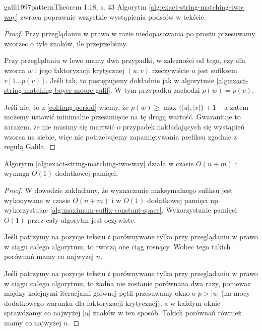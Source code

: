 \begin{theorem}{galil1997pattern}{Theorem 1.18, s. 43}
  Algorytm \ref{alg:exact-string-matching-two-way} zwraca poprawnie wszystkie wystąpienia podsłów w tekście.
\end{theorem}

\begin{proof}
  Przy przeglądaniu w prawo w razie niedopasowania po prostu przesuwamy wzorzec o tyle znaków, ile przejrzeliśmy.

  Przy przeglądaniu w lewo mamy dwa przypadki, w zależności od tego, czy dla wzorca $w$ i jego faktoryzacji krytycznej $(u, v)$ rzeczywiście $u$ jest sufiksem $v[1 \ldots p(v)]$.
  Jeśli tak, to postępujemy dokładnie jak w algorytmie \ref{alg:exact-string-matching-boyer-moore-galil}. W tym przypadku zachodzi $p(w) = p(v)$.

  Jeśli nie, to z \ref{col:long-period} wiemy, że $p(w) \ge \max\{|u|, |v|\} + 1$ -- a zatem możemy ustawić minimalne przesunięcie na tę drugą wartość.
  Gwarantuje to zarazem, że nie musimy się martwić o przypadek nakładających się wystąpień wzorca na siebie, więc nie potrzebujemy zapamiętywania prefiksu zgodnie z regułą Galila.
\end{proof}

\begin{theorem}{}{}
  Algorytm \ref{alg:exact-string-matching-two-way} działa w czasie $O(n + m)$ i wymaga $O(1)$ dodatkowej pamięci.
\end{theorem}

\begin{proof}
  W dowodzie zakładamy, że wyznaczanie maksymalnego sufiksu jest wykonywane w czasie $O(n + m)$ i w $O(1)$ dodatkowej pamięci np. wykorzystując \ref{alg:maximum-suffix-constant-space}. Wykorzystanie pamięci $O(1)$ przez cały algorytm jest oczywiste.

  Jeśli patrzymy na pozycje tekstu $t$ porównywane tylko przy przeglądaniu w prawo w ciągu całego algorytmu, to tworzą one ciąg rosnący. Wobec tego takich porównań mamy co najwyżej $n$.

  Jeśli patrzymy na pozycje tekstu $t$ porównywane tylko przy przeglądaniu w prawo w ciągu całego algorytmu, to żadna nie zostanie porównana dwa razy, ponieważ między kolejnymi iteracjami głównej pętli przesuwamy okno o $p > |u|$ (na mocy dodatkowego warunku dla faktoryzacji krytycznej), a w każdym oknie sprawdzamy co najwyżej $|u|$ znaków w ten sposób.
  Takich porównań również mamy co najwyżej $n$.
\end{proof}
